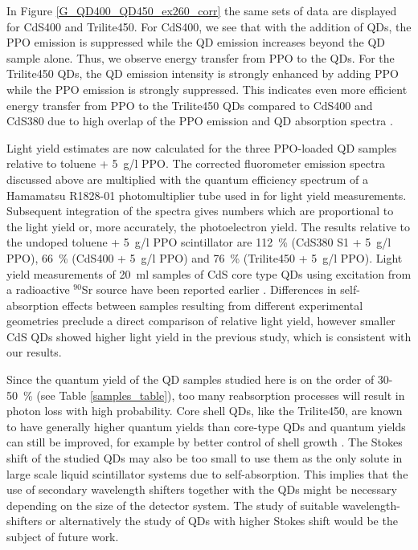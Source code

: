 \documentclass[cits]{JINST}
\begin{document}
In Figure \ref{G_QD400_QD450_ex260_corr} the same sets of data are displayed for CdS400 and Trilite450. For CdS400, we see that with the addition of QDs, the PPO emission is suppressed while the QD emission increases beyond the QD sample alone. Thus, we observe energy transfer from PPO to the QDs. For the Trilite450 QDs, the QD emission intensity is strongly enhanced by adding PPO while the PPO emission is strongly suppressed.  This indicates even more efficient energy transfer from PPO to the Trilite450 QDs compared to CdS400 and CdS380 due to high overlap of the PPO emission and QD absorption spectra \cite{foerster}.  

Light yield estimates are now calculated for the three PPO-loaded QD samples relative to toluene + 5~g/l PPO. The corrected fluorometer emission spectra discussed above are multiplied with the quantum efficiency spectrum of a Hamamatsu R1828-01 photomultiplier tube used in \cite{mitpaper} for light yield measurements. Subsequent integration of the spectra gives numbers which are proportional to the light yield or, more accurately, the photoelectron yield. The results relative to the undoped toluene + 5~g/l PPO scintillator are 112~\% (CdS380 S1 + 5~g/l PPO), 66~\% (CdS400 + 5~g/l PPO) and 76~\% (Trilite450 + 5~g/l PPO). Light yield measurements of 20~ml samples of CdS core type QDs using excitation from a radioactive $^{90}$Sr source have been reported earlier \cite{mitpaper}. Differences in self-absorption effects between samples resulting from different experimental geometries preclude a direct comparison of relative light yield, however smaller CdS QDs showed higher light yield in the previous study, which is consistent with our results. 
  
Since the quantum yield of the QD samples studied here is on the order of 30-50~\% (see Table \ref{samples_table}), too many reabsorption processes will result in photon loss with high probability. Core shell QDs, like the Trilite450, are known to have generally higher quantum yields than core-type QDs \cite{swafford2006,dabbousi1997,obrien2011} and quantum yields can still be improved, for example by better control of shell growth \cite{mcbride2006}. The Stokes shift of the studied QDs may also be too small to use them as the only solute in large scale liquid scintillator systems due to self-absorption. This implies that the use of secondary wavelength shifters together with the QDs might be necessary depending on the size of the detector system. The study of suitable wavelength-shifters or alternatively the study of QDs with higher Stokes shift would be the subject of future work. 
\end{document}
